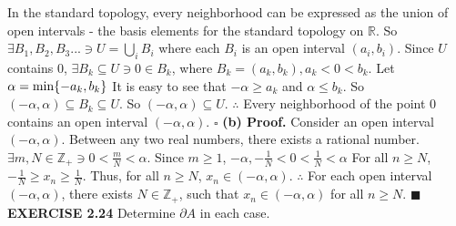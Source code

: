 \documentclass[12pt]{article}
\begin{document}
  In the standard topology, every neighborhood can be expressed as the union of open intervals - the basis elements for the standard topology on \(\mathbb{R}\).\newline \newline
  So \(\exists B_1, B_2,B_3... \ni U = \bigcup_i B_i\) where each \(B_i\) is an open interval \((a_i, b_i)\).
  \newline
  Since \(U\) contains 0, \(\exists B_k \subseteq U \ni 0 \in B_k\), where \(B_k = (a_k, b_k), a_k < 0 < b_k\).
  \newline \newline
  Let \(\alpha = \textup{min}\{-a_k, b_k\}\)
  \newline
  It is easy to see that \(-\alpha \geq a_k\) and \(\alpha \leq b_k\).
  \newline
  So \((-\alpha, \alpha) \subseteq B_k \subseteq U\).
  \newline
  So \((-\alpha, \alpha) \subseteq U\).
  \newline
  \(\therefore\) Every neighborhood of the point 0 contains an open interval \((-\alpha, \alpha)\).
  \newline \(\square\) \newline \newline
  \textbf{(b) Proof.} \newline
  Consider an open interval \((-\alpha, \alpha)\).
  \newline \newline
  Between any two real numbers, there exists a rational number.
  \newline
  \(\exists m,N \in \mathbb{Z}_+ \ni 0 < \frac{m}{N} < \alpha\).
  \newline
  Since \(m \geq 1\), \(-\alpha, -\frac{1}{N} < 0 < \frac{1}{N} < \alpha\)
  \newline \newline
  For all \(n \geq N\), \(-\frac{1}{N} \geq x_n \geq \frac{1}{N}\).
  \newline
  Thus, for all \(n \geq N\), \(x_n \in (-\alpha, \alpha)\).
  \newline
  \(\therefore\) For each open interval \((-\alpha, \alpha)\), there exists \(N \in \mathbb{Z}_+\), such that \(x_n \in (-\alpha, \alpha)\) for all \(n \geq N\).
  \newline \(\blacksquare\)
  \newpage
  \noindent
  \textbf{EXERCISE 2.24} Determine \(\partial A\) in each case.
\end{document}
